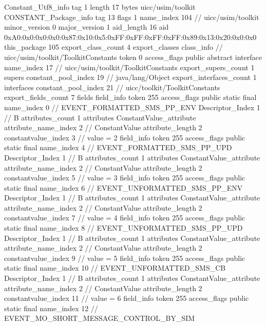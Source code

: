 {{{		}
		Constant_Utf8_info {
			tag	1
			length	17
			bytes	uicc/usim/toolkit
		}
		CONSTANT_Package_info {
			tag	13
			flags	1
			name_index	104		// uicc/usim/toolkit
			minor_version	0
			major_version	1
			aid_length	16
			aid	0xA0:0x0:0x0:0x0:0x87:0x10:0x5:0xFF:0xFF:0xFF:0xFF:0x89:0x13:0x20:0x0:0x0
		}
	}
	this_package	105
	export_class_count	4
	export_classes {
		class_info {		// uicc/usim/toolkit/ToolkitConstants
			token	0
			access_flags	public abstract interface
			name_index	17		// uicc/usim/toolkit/ToolkitConstants
			export_supers_count	1
			supers {
				constant_pool_index	19		// java/lang/Object
			}
			export_interfaces_count	1
			interfaces {
				constant_pool_index	21		// uicc/toolkit/ToolkitConstants
			}
			export_fields_count	7
			fields {
			field_info {
				token	255
				access_flags	public static final
				name_index	0		// EVENT_FORMATTED_SMS_PP_ENV
				Descriptor_Index	1		// B
				attributes_count	1
				attributes {
				ConstantValue_attribute {
					attribute_name_index	2		// ConstantValue
					attribute_length	2
					constantvalue_index	3		// value = 2
				}
				}
			}
			field_info {
				token	255
				access_flags	public static final
				name_index	4		// EVENT_FORMATTED_SMS_PP_UPD
				Descriptor_Index	1		// B
				attributes_count	1
				attributes {
				ConstantValue_attribute {
					attribute_name_index	2		// ConstantValue
					attribute_length	2
					constantvalue_index	5		// value = 3
				}
				}
			}
			field_info {
				token	255
				access_flags	public static final
				name_index	6		// EVENT_UNFORMATTED_SMS_PP_ENV
				Descriptor_Index	1		// B
				attributes_count	1
				attributes {
				ConstantValue_attribute {
					attribute_name_index	2		// ConstantValue
					attribute_length	2
					constantvalue_index	7		// value = 4
				}
				}
			}
			field_info {
				token	255
				access_flags	public static final
				name_index	8		// EVENT_UNFORMATTED_SMS_PP_UPD
				Descriptor_Index	1		// B
				attributes_count	1
				attributes {
				ConstantValue_attribute {
					attribute_name_index	2		// ConstantValue
					attribute_length	2
					constantvalue_index	9		// value = 5
				}
				}
			}
			field_info {
				token	255
				access_flags	public static final
				name_index	10		// EVENT_UNFORMATTED_SMS_CB
				Descriptor_Index	1		// B
				attributes_count	1
				attributes {
				ConstantValue_attribute {
					attribute_name_index	2		// ConstantValue
					attribute_length	2
					constantvalue_index	11		// value = 6
				}
				}
			}
			field_info {
				token	255
				access_flags	public static final
				name_index	12		// EVENT_MO_SHORT_MESSAGE_CONTROL_BY_SIM
}}}}}

